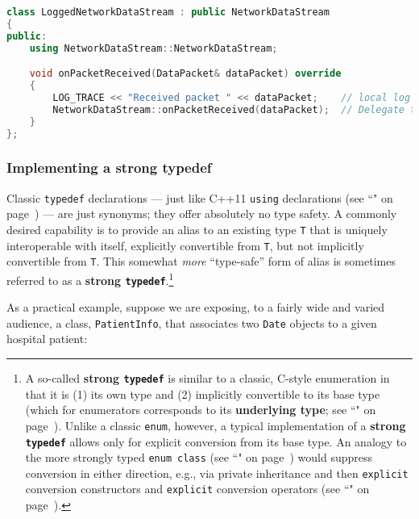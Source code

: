 \begin{lstlisting}[language=C++]
class LoggedNetworkDataStream : public NetworkDataStream
{
public:
    using NetworkDataStream::NetworkDataStream;

    void onPacketReceived(DataPacket& dataPacket) override
    {
        LOG_TRACE << "Received packet " << dataPacket;    // local log facility
        NetworkDataStream::onPacketReceived(dataPacket);  // Delegate to base.
    }
};
\end{lstlisting}


\subsubsection[Implementing a strong {\tt typedef}]{Implementing a strong {\SubsubsecCode typedef}}\label{implementing-a-strong-typedef}

Classic \texttt{typedef} declarations --- just like C++11
\texttt{using} declarations (see ``" on page~\pageref{alias-declarations-and-alias-templates}) --- are just synonyms; they
offer absolutely no type safety. A commonly desired capability is to
provide an alias to an existing type \texttt{T} that is uniquely
interoperable with itself, explicitly convertible from \texttt{T}, but
not implicitly convertible from \texttt{T}. This somewhat \emph{more}
``type-safe'' form of alias is sometimes referred to as a \textbf{strong
\texttt{typedef}}.{\cprotect\footnote{A so-called \textbf{strong
  \texttt{typedef}} is similar to a classic, C-style enumeration in
  that it is (1) its own type and (2) implicitly convertible to its
  base type (which for enumerators corresponds to its
  \textbf{underlying type}; see ``" on page~\pageref{explicit-enumeration-underlying-type}). Unlike a classic
  \texttt{enum}, however, a typical implementation of a \textbf{strong
  \texttt{typedef}} allows only for explicit conversion from its base
  type. An analogy to the more strongly typed
\texttt{enum}~\texttt{class} (see ``" on page~\pageref{enumclass}) would suppress conversion
  in either direction, e.g., via private inheritance and then
  \texttt{explicit} conversion constructors and
 \texttt{explicit} conversion operators (see ``" on page~\pageref{explicit-conversion-operators}).}}

As a practical example, suppose we are exposing, to a fairly wide and varied audience, a class,
\texttt{PatientInfo}, that associates two \texttt{Date} objects to a
given hospital patient:


